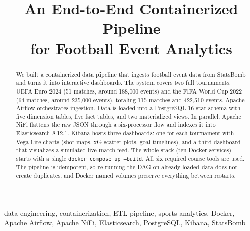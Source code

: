 \documentclass[conference]{IEEEtran}
\begin{document}
\title{An End-to-End Containerized Pipeline\\for Football Event Analytics}

\author{
}

\maketitle

\begin{abstract}
We built a containerized data pipeline that ingests football event data from
StatsBomb and turns it into interactive dashboards. The system covers two full
tournaments: UEFA Euro 2024 (51 matches, around 188{,}000 events) and the FIFA
World Cup 2022 (64 matches, around 235{,}000 events), totaling 115 matches and
422{,}510 events. Apache Airflow orchestrates ingestion. Data is loaded into a
PostgreSQL 16 star schema with five dimension tables, five fact tables, and two
materialized views. In parallel, Apache NiFi flattens the raw JSON through a
six-processor flow and indexes it into Elasticsearch 8.12.1. Kibana hosts three
dashboards: one for each tournament with Vega-Lite charts (shot maps, xG scatter
plots, goal timelines), and a third dashboard that visualizes a simulated live
match feed. The whole stack (ten Docker services) starts with a single
\texttt{docker compose up --build}. All six required course tools are used. The
pipeline is idempotent, so re-running the DAG on already-loaded data does not
create duplicates, and Docker named volumes preserve everything between restarts.
\end{abstract}

\begin{IEEEkeywords}
data engineering, containerization, ETL pipeline, sports analytics, Docker,
Apache Airflow, Apache NiFi, Elasticsearch, PostgreSQL, Kibana, StatsBomb
\end{IEEEkeywords}
\end{document}
